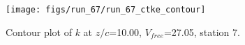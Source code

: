 \begin{figure}[H]
\centering
\texttt{[image: figs/run\_67/run\_67\_ctke\_contour]}
\caption{Contour plot of $k$ at $z/c$=10.00, $V_{free}$=27.05, station 7.}
\end{figure}


